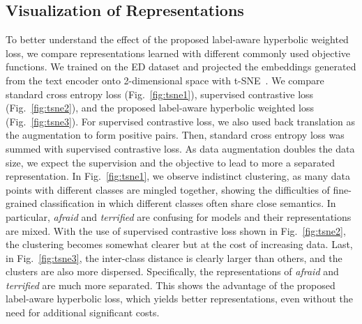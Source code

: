 \subsection{Visualization of Representations}
To better understand the effect of the proposed label-aware hyperbolic weighted
loss, we compare representations learned with different commonly used
objective functions. We trained on the ED dataset and projected
the embeddings generated from the text encoder onto 2-dimensional space with
t-SNE~\cite{van2008visualizing}. We compare standard cross entropy loss
(Fig.~\ref{fig:tsne1}), supervised contrastive loss~\cite{NEURIPS2020_supcon}
(Fig.~\ref{fig:tsne2}), and the proposed label-aware hyperbolic weighted loss
(Fig.~\ref{fig:tsne3}). For supervised contrastive loss, we also used
back translation as the augmentation to form
positive pairs. Then, standard cross entropy loss was summed with supervised
contrastive loss. As data augmentation doubles the data size, we
expect the supervision and the objective to lead to more a separated
representation.
In Fig.~\ref{fig:tsne1}, we observe indistinct clustering, as
many data points with different classes are mingled together, showing the
difficulties of fine-grained classification in which different classes
often share close semantics. In particular, \emph{afraid} and \emph{terrified} are confusing for models and their representations are mixed. 
With the use of supervised contrastive loss shown
in Fig.~\ref{fig:tsne2}, the clustering becomes somewhat clearer but at the
cost of increasing data.
Last, in Fig.~\ref{fig:tsne3}, the inter-class distance is
clearly larger than others, and the clusters are also more dispersed. 
Specifically, the representations of \emph{afraid} and \emph{terrified} are much more separated.
This shows the advantage of the proposed label-aware hyperbolic loss, which yields
better representations, even without the need for additional significant costs.